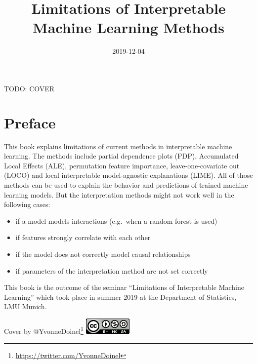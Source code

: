 \documentclass[]{krantz}
\title{Limitations of Interpretable Machine Learning Methods}
\date{2019-12-04}
\providecommand{\tightlist}{%
  \setlength{\itemsep}{0pt}\setlength{\parskip}{0pt}}
\renewcommand{\href}[2]{#2\footnote{\url{#1}}}
\begin{document}
\maketitle


\thispagestyle{empty}

\begin{center}
\end{center}

\setlength{\abovedisplayskip}{-5pt}
\setlength{\abovedisplayshortskip}{-5pt}

{
\hypersetup{linkcolor=black}
\setcounter{tocdepth}{0}
\tableofcontents
}
\listoftables
\listoffigures
TODO: COVER

\chapter*{Preface}\label{preface}


This book explains limitations of current methods in interpretable
machine learning. The methods include partial dependence plots (PDP),
Accumulated Local Effects (ALE), permutation feature importance,
leave-one-covariate out (LOCO) and local interpretable model-agnostic
explanations (LIME). All of those methods can be used to explain the
behavior and predictions of trained machine learning models. But the
interpretation methods might not work well in the following cases:

\begin{itemize}
\tightlist
\item
  if a model models interactions (e.g.~when a random forest is used)
\item
  if features strongly correlate with each other
\item
  if the model does not correctly model causal relationships
\item
  if parameters of the interpretation method are not set correctly
\end{itemize}

This book is the outcome of the seminar ``Limitations of Interpretable
Machine Learning'' which took place in summer 2019 at the Department of
Statistics, LMU Munich.

Cover by \href{https://twitter.com/YvonneDoinel}{@YvonneDoinel}
\includegraphics{images/by-nc-sa.png}
\end{document}
